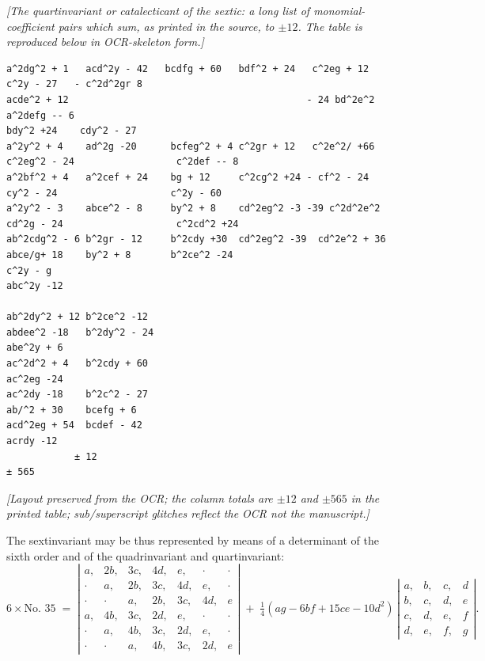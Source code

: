 \documentclass[11pt]{article}
\begin{document}
\textit{[The quartinvariant or catalecticant of the sextic: a long list of monomial-coefficient pairs which sum, as printed in the source, to $\pm 12$. The table is reproduced below in OCR-skeleton form.]}

\smallskip

\begin{small}
\begin{verbatim}
a^2dg^2 + 1   acd^2y - 42   bcdfg + 60   bdf^2 + 24   c^2eg + 12   c^2y - 27   - c^2d^2gr 8
acde^2 + 12                                          - 24 bd^2e^2
a^2defg -- 6                                                      bdy^2 +24    cdy^2 - 27
a^2y^2 + 4    ad^2g -20      bcfeg^2 + 4 c^2gr + 12   c^2e^2/ +66   c^2eg^2 - 24                  c^2def -- 8
a^2bf^2 + 4   a^2cef + 24    bg + 12     c^2cg^2 +24 - cf^2 - 24    cy^2 - 24                    c^2y - 60
a^2y^2 - 3    abce^2 - 8     by^2 + 8    cd^2eg^2 -3 -39 c^2d^2e^2  cd^2g - 24                    c^2cd^2 +24
ab^2cdg^2 - 6 b^2gr - 12     b^2cdy +30  cd^2eg^2 -39  cd^2e^2 + 36
abce/g+ 18    by^2 + 8       b^2ce^2 -24                            c^2y - g
abc^2y -12

ab^2dy^2 + 12 b^2ce^2 -12
abdee^2 -18   b^2dy^2 - 24
abe^2y + 6
ac^2d^2 + 4   b^2cdy + 60
ac^2eg -24
ac^2dy -18    b^2c^2 - 27
ab/^2 + 30    bcefg + 6
acd^2eg + 54  bcdef - 42
acrdy -12
            ± 12                                                                            ± 565
\end{verbatim}
\end{small}

\textit{[Layout preserved from the OCR; the column totals are $\pm 12$ and $\pm 565$ in the printed table; sub/superscript glitches reflect the OCR not the manuscript.]}

\medskip

The sextinvariant may be thus represented by means of a determinant of the sixth order and of the quadrinvariant and quartinvariant:
\[
6 \times \text{No.\ 35} \;=\; \left|\begin{array}{ccccccc}
a, & 2b, & 3c, & 4d, & e, & \cdot & \cdot \\
\cdot & a, & 2b, & 3c, & 4d, & e, & \cdot \\
\cdot & \cdot & a, & 2b, & 3c, & 4d, & e \\
a, & 4b, & 3c, & 2d, & e, & \cdot & \cdot \\
\cdot & a, & 4b, & 3c, & 2d, & e, & \cdot \\
\cdot & \cdot & a, & 4b, & 3c, & 2d, & e
\end{array}\right|
\;+\; \tfrac14 (ag - 6 bf + 15 ce - 10 d^2)\,
\left|\begin{array}{cccc}
a, & b, & c, & d \\
b, & c, & d, & e \\
c, & d, & e, & f \\
d, & e, & f, & g
\end{array}\right| .
\]
\end{document}

